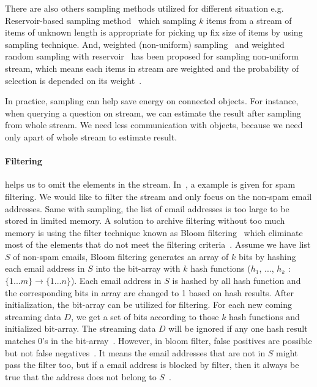 There are also others sampling methods utilized for different situation e.g.
Reservoir-based sampling method~\cite{vitter1985random, vitter1985random,
Aggarwal2007DataS} which sampling $k$ items from a stream of items of unknown
length is appropriate for picking up fix size of items by using sampling
technique. And, weighted (non-uniform) sampling~\cite{chaudhuri1999random} and
weighted random sampling with reservoir~\cite{efraimidis2006weighted} has been
proposed for sampling non-uniform stream, which means each items in stream are
weighted and the probability of selection is depended on its
weight~\cite{chaudhuri1999random}.

In practice, sampling can help save energy on connected objects. For instance,
when querying a question on stream, we can estimate the result after sampling
from whole stream. We need less communication with objects, because we need only
apart of whole stream to estimate result.

\paragraph{Filtering} helps us to omit the elements in the stream.
In~\cite{leskovec2014mining}, a example is given for spam filtering. We would
like to filter the stream and only focus on the non-spam email addresses. Same
with sampling, the list of email addresses is too large to be stored in limited
memory. A solution to archive filtering without too much memory is using the
filter technique known as Bloom filtering~\cite{bloom1970space} which eliminate
most of the elements that do not meet the filtering
criteria~\cite{leskovec2014mining}. Assume we have list $S$ of non-spam emails,
Bloom filtering generates an array of $k$ bits by hashing each email address in
$S$ into the bit-array with $k$ hash functions ($h_1$, ..., $h_k$ : $\{1...m\}
\rightarrow \{1...n\}$). Each email address in $S$ is hashed by all hash
function and the corresponding bits in array are changed to 1 based on hash
results. After initialization, the bit-array  can be utilized for filtering. For
each new coming streaming data $D$, we get a set of bits according to those $k$
hash functions and initialized bit-array. The streaming data $D$ will be ignored
if any one hash result matches 0's in the bit-array~\cite{leskovec2014mining}.
However, in bloom filter, false positives are possible but not false
negatives~\cite{ahmed2019data}. It means the email addresses that are not in $S$
might pass the filter too, but if a email address is blocked by filter, then it
always be true that the address does not belong to $S$~\cite{ahmed2019data}.

